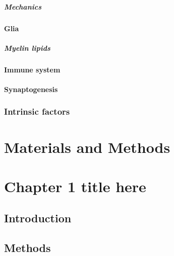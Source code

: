 \documentclass[
]{book}
\begin{document}
\hypertarget{mechanics}{%
\paragraph{Mechanics}\label{mechanics}}

\hypertarget{glia}{%
\subsubsection{Glia}\label{glia}}

\hypertarget{myelin-lipids}{%
\paragraph{Myelin lipids}\label{myelin-lipids}}

\hypertarget{immune-system}{%
\subsubsection{Immune system}\label{immune-system}}

\hypertarget{synaptogenesis}{%
\subsubsection{Synaptogenesis}\label{synaptogenesis}}

\hypertarget{intrinsic-factors}{%
\subsection{Intrinsic factors}\label{intrinsic-factors}}

\hypertarget{METHODS}{%
\chapter{Materials and Methods}\label{METHODS}}

\hypertarget{chapter-1-title-here}{%
\chapter{Chapter 1 title here}\label{chapter-1-title-here}}

\hypertarget{introduction-1}{%
\section{Introduction}\label{introduction-1}}

\lipsum

\hypertarget{methods}{%
\section{Methods}\label{methods}}
\end{document}
